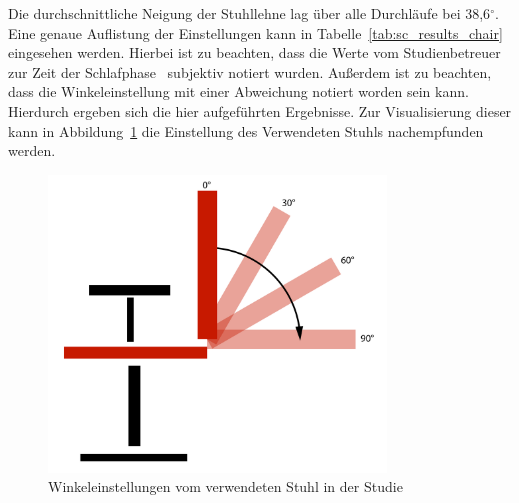 Die durchschnittliche Neigung der Stuhllehne lag über alle Durchläufe bei 38,6$^\circ$. Eine genaue Auflistung der Einstellungen kann in Tabelle~\ref{tab:sc_results_chair} eingesehen werden. Hierbei ist zu beachten, dass die Werte vom Studienbetreuer zur Zeit der Schlafphase~ subjektiv notiert wurden. Außerdem ist zu beachten, dass die Winkeleinstellung mit einer Abweichung notiert worden sein kann. Hierdurch ergeben sich die hier aufgeführten Ergebnisse. Zur Visualisierung dieser kann in Abbildung~\ref{fig:chair_backrest} die Einstellung des Verwendeten Stuhls nachempfunden~ werden.

\begin{figure}
	\includegraphics[width=0.8\textwidth]{./images/chair}
	\caption{Winkeleinstellungen vom verwendeten Stuhl in der Studie}
	\label{fig:chair_backrest}
\end{figure}


